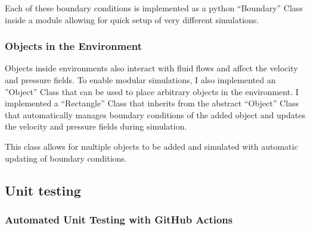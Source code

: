 Each of these boundary conditions is implemented as a python ``Boundary'' Class inside a module allowing for quick setup of very different simulations.

\subsubsection{Objects in the Environment}
Objects inside environments also interact with fluid flows and affect the velocity and pressure fields.
To enable modular simulations, I also implemented an ''Object'' Class that can be used to place arbitrary objects in the environment.
I implemented a ``Rectangle'' Class that inherits from the abstract ``Object'' Class that automatically manages boundary conditions of the added object and updates the velocity and pressure fields during simulation.

This class allows for multiple objects to be added and simulated with automatic updating of boundary conditions.


\subsection{Unit testing}

\subsubsection{Automated Unit Testing with GitHub Actions}
